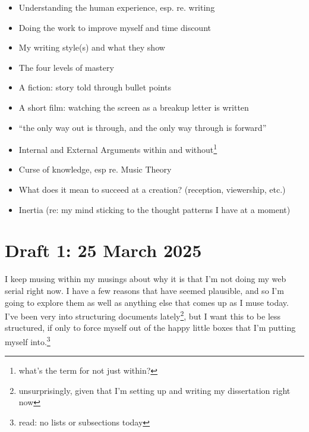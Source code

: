 \documentclass[12pt]{article}[titlepage]
\newcommand{\say}[1]{``#1''}
\renewcommand{\,}{\textsuperscript{,}}
\begin{document}
\begin{itemize}
\begin{itemize}
\begin{itemize}
\begin{itemize}
\item Understanding the human experience, esp. re. writing  
\item Doing the work to improve myself and time discount  
\item My writing style(s) and what they show  
\item The four levels of mastery  
\item A fiction: story told through bullet points  
\item A short film: watching the screen as a breakup letter is written  
\item \say{the only way out is through, and the only way through is forward}  
\item Internal and External Arguments within and without\footnote{what's the term for not just within?}  
\item Curse of knowledge, esp re. Music Theory  
\item What does it mean to succeed at a creation? (reception, viewership, etc.)  
\item Inertia (re: my mind sticking to the thought patterns I have at a moment)  
\end{itemize}   
\end{itemize}   
\end{itemize}   
\end{itemize}

\section{Draft 1: 25 March 2025}

I keep musing within my musings about why it is that I'm not doing my web serial right now.  
I have a few reasons that have seemed plausible, and so I'm going to explore them as well as anything else that comes up as I muse today.  
I've been very into structuring documents lately\footnote{unsurprisingly, given that I'm setting up and writing my dissertation right now}, but I want this to be less structured, if only to force myself out of the happy little boxes that I'm putting myself into.\footnote{read: no lists or subsections today}
\end{document}
